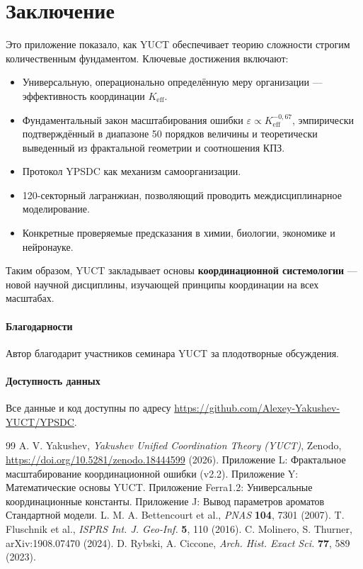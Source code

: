 \documentclass[11pt]{article}
\theoremstyle{remark}
\newcommand{\Keff}{K_{\mathrm{eff}}}
\begin{document}
	\section{Заключение}
	\label{sec:conclusion}
	
	Это приложение показало, как YUCT обеспечивает теорию сложности строгим количественным фундаментом. Ключевые достижения включают:
	\begin{itemize}
		\item Универсальную, операционально определённую меру организации — эффективность координации \(\Keff\).
		\item Фундаментальный закон масштабирования ошибки \(\varepsilon \propto \Keff^{-0,67}\), эмпирически подтверждённый в диапазоне 50 порядков величины и теоретически выведенный из фрактальной геометрии и соотношения КПЗ.
		\item Протокол YPSDC как механизм самоорганизации.
		\item 120-секторный лагранжиан, позволяющий проводить междисциплинарное моделирование.
		\item Конкретные проверяемые предсказания в химии, биологии, экономике и нейронауке.
	\end{itemize}
	
	Таким образом, YUCT закладывает основы \textbf{координационной системологии} — новой научной дисциплины, изучающей принципы координации на всех масштабах.
	
	\paragraph*{Благодарности}
	Автор благодарит участников семинара YUCT за плодотворные обсуждения.
	
	\paragraph*{Доступность данных}
	Все данные и код доступны по адресу \url{https://github.com/Alexey-Yakushev-YUCT/YPSDC}.
	
	\begin{thebibliography}{99}
		 A. V. Yakushev, \emph{Yakushev Unified Coordination Theory (YUCT)}, Zenodo, \url{https://doi.org/10.5281/zenodo.18444599} (2026).
		 Приложение L: Фрактальное масштабирование координационной ошибки (v2.2).
		 Приложение Y: Математические основы YUCT.
		 Приложение Ferra1.2: Универсальные координационные константы.
		 Приложение J: Вывод параметров ароматов Стандартной модели.
		 L. M. A. Bettencourt et al., \emph{PNAS} \textbf{104}, 7301 (2007).
		 T. Fluschnik et al., \emph{ISPRS Int. J. Geo‑Inf.} \textbf{5}, 110 (2016).
		 C. Molinero, S. Thurner, arXiv:1908.07470 (2024).
		 D. Rybski, A. Ciccone, \emph{Arch. Hist. Exact Sci.} \textbf{77}, 589 (2023).
	\end{thebibliography}
	
\end{document}
